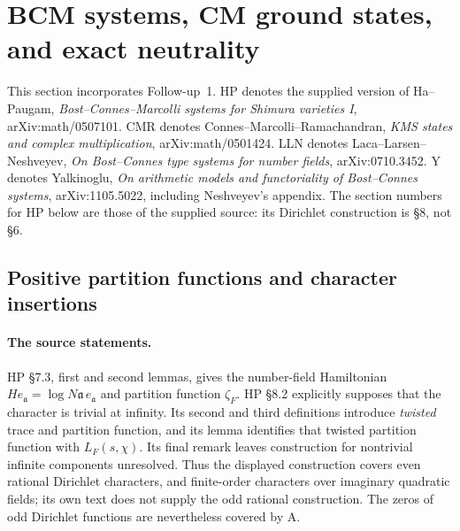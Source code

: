 \section{BCM systems, CM ground states, and exact neutrality}
\label{sec:bcm-neutrality}

This section incorporates Follow-up~1. HP denotes the supplied version
of Ha--Paugam, \emph{Bost--Connes--Marcolli systems for Shimura varieties I},
arXiv:math/0507101. CMR denotes Connes--Marcolli--Ramachandran,
\emph{KMS states and complex multiplication}, arXiv:math/0501424.
LLN denotes Laca--Larsen--Neshveyev, \emph{On Bost--Connes type systems
for number fields}, arXiv:0710.3452. Y denotes Yalkinoglu,
\emph{On arithmetic models and functoriality of Bost--Connes systems},
arXiv:1105.5022, including Neshveyev's appendix.
The section numbers for HP below are those of the supplied source:
its Dirichlet construction is \S8, not \S6.

\subsection{Positive partition functions and character insertions}

\paragraph{The source statements.}
HP \S7.3, first and second lemmas, gives the number-field Hamiltonian
$H e_{\mathfrak a}=\log N\mathfrak a\,e_{\mathfrak a}$ and partition
function $\zeta_F$. HP \S8.2 explicitly supposes that the character
is trivial at infinity. Its second and third definitions introduce
\emph{twisted} trace and partition function, and its lemma identifies
that twisted partition function with $L_F(s,\chi)$. Its final remark
leaves construction for nontrivial infinite components unresolved.
Thus the displayed construction covers even rational Dirichlet
characters, and finite-order characters over imaginary quadratic
fields; its own text does not supply the odd rational construction.
The zeros of odd Dirichlet functions are nevertheless covered by A.

